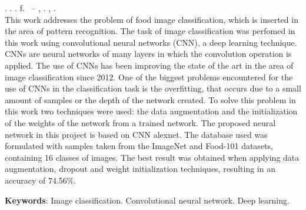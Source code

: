 
\begin{resumo}[ABSTRACT]
\begin{SingleSpacing}

\imprimirautorcitacao. \imprimirtitleabstract. \imprimirdata. \pageref {LastPage} f. \imprimirprojeto\ – \imprimirprograma, \imprimirinstituicao. \imprimirlocal, \imprimirdata.\\


This work addresses the problem of food image classification, which is inserted in the area of pattern recognition. The task of image classification was perfomed in this work using convolutional neural networks (CNN), a deep learning technique. CNNs are neural networks of many layers in which the convolution operation is applied. The use of CNNs has been improving the state of the art in the area of image classification since 2012. One of the biggest problems encountered for the use of CNNs in the classification task is the overfitting, that occurs due to a small amount of samples or the depth of the network created. To solve this problem in this work two techniques were used: the data augmentation and the initialization of the weights of the network from a trained network. The proposed neural network in this project is based on CNN alexnet. The database used was formulated with samples taken from the ImageNet and Food-101 datasets, containing 16 classes of images. The best result was obtained when applying data augmentation, dropout and weight initialization techniques, resulting in an accuracy of 74.56\%.

\textbf{Keywords}: Image classification. Convolutional neural network. Deep learning.

\end{SingleSpacing}
\end{resumo}

